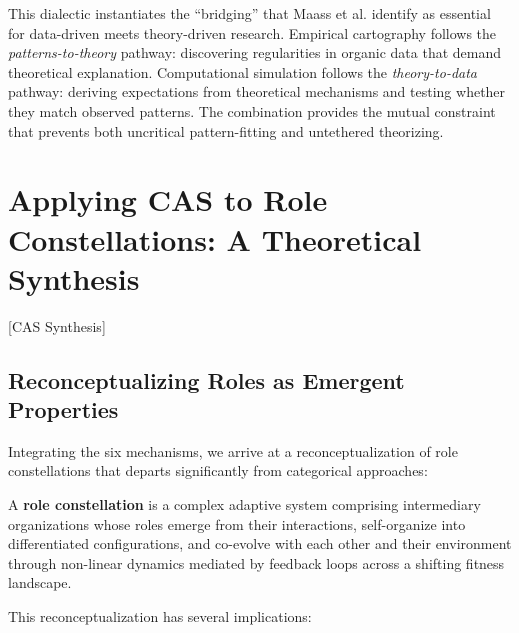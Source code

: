 \documentclass[../main.tex]{subfiles}
\begin{document}
This dialectic instantiates the ``bridging'' that Maass et al. \cite{maass2018data} identify as essential for data-driven meets theory-driven research. Empirical cartography follows the \textit{patterns-to-theory} pathway: discovering regularities in organic data that demand theoretical explanation. Computational simulation follows the \textit{theory-to-data} pathway: deriving expectations from theoretical mechanisms and testing whether they match observed patterns. The combination provides the mutual constraint that prevents both uncritical pattern-fitting and untethered theorizing.


\section{Applying CAS to Role Constellations: A Theoretical Synthesis}[CAS Synthesis]

\subsection{Reconceptualizing Roles as Emergent Properties}

Integrating the six mechanisms, we arrive at a reconceptualization of role constellations that departs significantly from categorical approaches:

\begin{roledef}
A \textbf{role constellation} is a complex adaptive system comprising intermediary organizations whose roles emerge from their interactions, self-organize into differentiated configurations, and co-evolve with each other and their environment through non-linear dynamics mediated by feedback loops across a shifting fitness landscape.
\end{roledef}

This reconceptualization has several implications:
\end{document}
